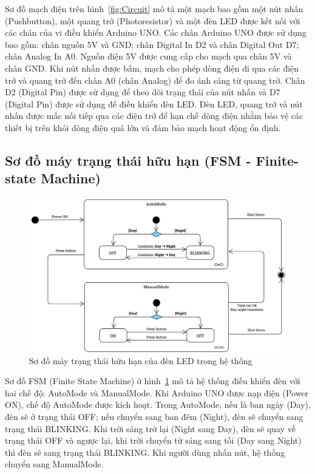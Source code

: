 {Sơ đồ mạch điện trên hình~\ref{fig:Circuit} mô tả một mạch bao gồm một nút nhấn (Pushbutton), một quang trở (Photoresistor) và một đèn LED được kết nối với các chân của vi điều khiển Arduino UNO. Các chân Arduino UNO được sử dụng bao gồm: chân nguồn 5V và GND; chân Digital In D2 và chân Digital Out D7; chân Analog In A0. Nguồn điện 5V được cung cấp cho mạch qua chân 5V và chân GND. Khi nút nhấn được bấm, mạch cho phép dòng điện đi qua các điện trở và quang trở đến chân A0 (chân Analog) để đo ánh sáng từ quang trở. Chân D2 (Digital Pin) được sử dụng để theo dõi trạng thái của nút nhấn và D7 (Digital Pin) được sử dụng để điều khiển đèn LED. Đèn LED, quang trở và nút nhấn được mắc nối tiếp qua các điện trở để hạn chế dòng điện nhằm bảo vệ các thiết bị trên khỏi dòng điện quá lớn và đảm bảo mạch hoạt động ổn định.


\subsection{Sơ đồ máy trạng thái hữu hạn (FSM - Finite-state Machine)}
\begin{figure}[H]
    \centering
    \includegraphics[scale=0.16]{img/FSM-2.jpg}
    \caption{Sơ đồ máy trạng thái hữu hạn của đèn LED trong hệ thống}
    \label{fig:FSM}
\end{figure}

Sơ đồ FSM (Finite State Machine) ở hình~\ref{fig:FSM}  mô tả hệ thống điều khiển đèn với hai chế độ: AutoMode và ManualMode. Khi Arduino UNO được nạp điện (Power ON), chế độ AutoMode được kích hoạt. Trong AutoMode, nếu là ban ngày (Day), đèn sẽ ở trạng thái OFF; nếu chuyển sang ban đêm (Night), đèn sẽ chuyển sang trạng thái BLINKING. Khi trời sáng trở lại (Night sang Day), đèn sẽ quay về trạng thái OFF và ngược lại, khi trời chuyển từ sáng sang tối (Day sang Night) thì đèn sẽ sang trạng thái BLINKING. Khi người dùng nhấn nút, hệ thống chuyển sang ManualMode.\\

}

